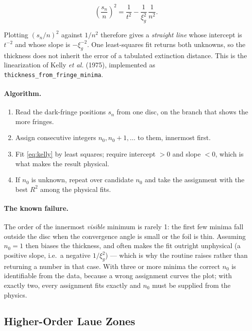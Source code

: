 \begin{equation}
  \left(\frac{s_{n}}{n}\right)^{2}
    = \frac{1}{t^{2}} - \frac{1}{\xi_{g}^{2}}\,\frac{1}{n^{2}} .
  \label{eq:kelly}
\end{equation}

Plotting \((s_n/n)^{2}\) against \(1/n^{2}\) therefore gives a \emph{straight line} whose
intercept is \(t^{-2}\) and whose slope is \(-\xi_{g}^{-2}\). One least-squares fit returns
both unknowns, so the thickness does not inherit the error of a tabulated extinction
distance. This is the linearization of Kelly \emph{et al.} (1975), implemented as
\texttt{thickness\_from\_fringe\_minima}.

\paragraph{Algorithm.}
\begin{enumerate}
  \item Read the dark-fringe positions \(s_n\) from one disc, on the branch that shows the
        more fringes.
  \item Assign consecutive integers \(n_0, n_0+1, \dots\) to them, innermost first.
  \item Fit \eqref{eq:kelly} by least squares; require intercept \(> 0\) and slope \(< 0\),
        which is what makes the result physical.
  \item If \(n_0\) is unknown, repeat over candidate \(n_0\) and take the assignment with
        the best \(R^{2}\) among the physical fits.
\end{enumerate}

\paragraph{The known failure.} The order of the innermost \emph{visible} minimum is rarely
1: the first few minima fall outside the disc when the convergence angle is small or the
foil is thin. Assuming \(n_0 = 1\) then biases the thickness, and often makes the fit
outright unphysical (a positive slope, i.e.\ a negative \(1/\xi_{g}^{2}\)) --- which is why
the routine raises rather than returning a number in that case. With three or more minima
the correct \(n_0\) is identifiable from the data, because a wrong assignment curves the
plot; with exactly two, every assignment fits exactly and \(n_0\) must be supplied from the
physics.

\subsection{Higher-Order Laue Zones}


